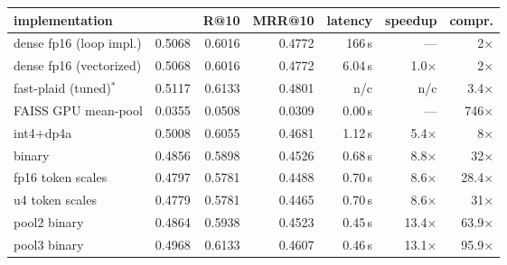 \begin{tabular}{l r r r r r r}
\toprule
implementation & \ndcg{} & R@10 & MRR@10 & latency & speedup & compr. \\
\midrule
dense fp16 (loop impl.) & 0.5068 & 0.6016 & 0.4772 & 166\,s & --- & 2$\times$ \\
dense fp16 (vectorized) & 0.5068 & 0.6016 & 0.4772 & 6.04\,s & 1.0$\times$ & 2$\times$ \\
fast-plaid (tuned)$^{\ast}$ & 0.5117 & 0.6133 & 0.4801 & n/c & n/c & 3.4$\times$ \\
FAISS GPU mean-pool & 0.0355 & 0.0508 & 0.0309 & 0.00\,s & --- & 746$\times$ \\
\midrule
\sysname{} int4$+$dp4a & 0.5008 & 0.6055 & 0.4681 & 1.12\,s & 5.4$\times$ & 8$\times$ \\
\sysname{} binary & 0.4856 & 0.5898 & 0.4526 & 0.68\,s & 8.8$\times$ & 32$\times$ \\
\sysname{} fp16 token scales & 0.4797 & 0.5781 & 0.4488 & 0.70\,s & 8.6$\times$ & 28.4$\times$ \\
\sysname{} u4 token scales & 0.4779 & 0.5781 & 0.4465 & 0.70\,s & 8.6$\times$ & 31$\times$ \\
\sysname{} pool2 binary & 0.4864 & 0.5938 & 0.4523 & 0.45\,s & 13.4$\times$ & 63.9$\times$ \\
\sysname{} pool3 binary & 0.4968 & 0.6133 & 0.4607 & 0.46\,s & 13.1$\times$ & 95.9$\times$ \\
\bottomrule
\end{tabular}
